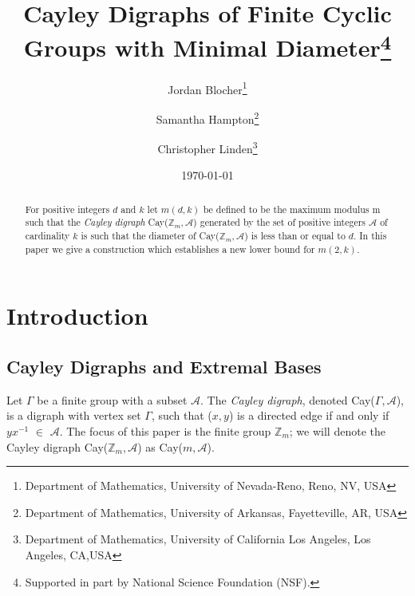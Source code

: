 \documentclass[11pt]{article}
\title{Cayley Digraphs of Finite Cyclic Groups with Minimal Diameter\footnote{Supported in part by National Science Foundation (NSF).}}
\author{Jordan Blocher\thanks{Department of Mathematics, University of Nevada-Reno, Reno, NV, USA}\and Samantha Hampton\thanks{Department of Mathematics, University of Arkansas, Fayetteville, AR, USA}\and Christopher Linden\thanks{Department of Mathematics, University of California Los Angeles, Los Angeles, CA,USA } }
\date{\today}
\theoremstyle{definition}
\def\Z{\mbox{$\mathbb Z$}}
\begin{document}
 
\baselineskip6mm\parskip4mm

\maketitle

\begin{abstract}
For positive integers $d$ and $k$ let $m(d,k)$ be defined to be the maximum modulus m such that the \emph{Cayley digraph} Cay($\Z_{m}, \mathcal{A}$) generated by the set of positive integers $\mathcal{A}$ of cardinality $k$ is such that the diameter of Cay($\Z_{m}, \mathcal{A}$) is less than or equal to $d$. 
In this paper we give a construction which establishes a new lower bound for $m(2, k)$.
\end{abstract}
 
\pagebreak

\section{Introduction}
\subsection{Cayley Digraphs and Extremal Bases} 
Let $\Gamma$ be a finite group with a subset $\mathcal{A}$. The \emph{Cayley digraph}, denoted Cay($\Gamma, \mathcal{A}$), is a digraph with vertex set $\Gamma$, such that ($x, y$) is a directed edge if and only if $yx^{-1}$ $\in$ $\mathcal{A}$.
The focus of this paper is the finite group $\Z_m$; we will denote the Cayley digraph Cay($\Z_m, \mathcal{A}$) as Cay($m, \mathcal{A}$).
\end{document}
